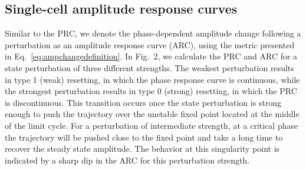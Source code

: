 \documentclass[11pt, letterpaper]{article}
\providecommand{\DIFadd}[1]{{\protect\color{blue}#1}} %
\providecommand{\DIFaddbegin}{} %
\providecommand{\DIFaddend}{} %
\begin{document}
\DIFaddend \subsection*{\DIFaddbegin \DIFadd{Single-cell amplitude }\DIFaddend response curves}
Similar to the \DIFaddbegin \DIFadd{PRC}\DIFaddend , we denote the phase-dependent amplitude change following a perturbation as an amplitude response curve (ARC), using the metric presented in Eq.~\ref{eq:ampchangedefinition}.
In Fig.\DIFaddbegin \DIFadd{~}\DIFaddend 2, we calculate the PRC and ARC for a state perturbation of \DIFaddbegin \DIFadd{three }\DIFaddend different strengths.
The weakest perturbation results in type 1 (weak) resetting, in which the phase response curve is continuous, while the strongest perturbation results in type 0 (strong) resetting, in which the \DIFaddbegin \DIFadd{PRC }\DIFaddend is discontinuous.
This transition occurs once the state perturbation is strong enough to push the trajectory over the unstable fixed point located at the middle of the limit cycle.
For a perturbation of intermediate strength, at a critical phase the trajectory will be pushed close to the fixed point and take a long time to recover the steady state amplitude.
\DIFaddbegin \DIFadd{The behavior at this }\DIFaddend singularity point is indicated by a sharp dip in the ARC for this perturbation strength.
\end{document}
